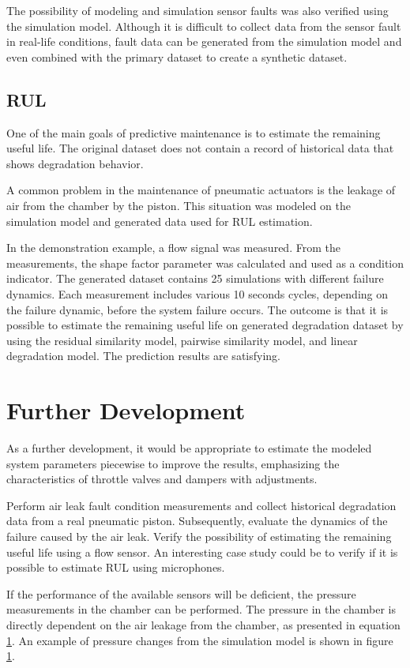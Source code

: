 The possibility of modeling and simulation sensor faults was also verified
using the simulation model. Although it is difficult to collect data from
the sensor fault in real-life conditions, fault data can be generated from
the simulation model and even combined with the primary dataset to create a
synthetic dataset.

\subsection{RUL}
One of the main goals of predictive maintenance is to estimate the
remaining useful life. The original dataset does not contain a record of
historical data that shows degradation behavior. 

A common problem in the maintenance of pneumatic actuators is the leakage
of air from the chamber by the piston. This situation was modeled on the
simulation model and generated data used for RUL estimation. 

In the demonstration example, a flow signal was measured. From the
measurements, the shape factor parameter was calculated and used as a
condition indicator. The generated dataset contains 25 simulations with
different failure dynamics. Each measurement includes various 10 seconds
cycles, depending on the failure dynamic, before the system failure occurs.
The outcome is that it is possible to estimate the remaining useful life on
generated degradation dataset by using the residual similarity model,
pairwise similarity model, and linear degradation model. The prediction
results are satisfying.

\section{Further Development}
As a further development, it would be appropriate to estimate the modeled
system parameters piecewise to improve the results, emphasizing the
characteristics of throttle valves and dampers with adjustments. 

Perform air leak fault condition measurements and collect historical
degradation data from a real pneumatic piston. Subsequently, evaluate the
dynamics of the failure caused by the air leak. Verify the possibility of
estimating the remaining useful life using a flow sensor. An interesting
case study could be to verify if it is possible to estimate RUL using
microphones.


If the performance of the available sensors will be deficient, the pressure
measurements in the chamber can be performed. The pressure in the chamber
is directly dependent on the air leakage from the chamber, as presented in
equation \ref{}. An example of pressure changes from the simulation model
is shown in figure \ref{}.
